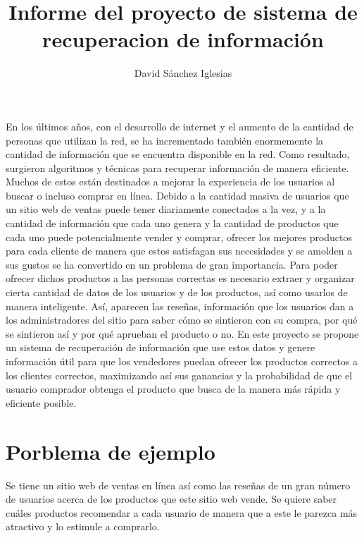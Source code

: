 \documentclass{llncs}
\title{Informe del proyecto de sistema de recuperacion de informaci\'on}
\author{David S\'anchez Iglesias}
\institute{Universidad de La Habana, Facultad de Matem\'atica y Computaci\'on}
\begin{document}
\maketitle

\begin{Introducción}
    En los \'ultimos a\~nos, con el desarrollo de internet y el aumento de la cantidad de personas que utilizan la red, se ha incrementado tambi\'en enormemente la cantidad de informaci\'on que se encuentra disponible en la red. Como resultado, surgieron algoritmos y t\'ecnicas para recuperar informaci\'on de manera eficiente. Muchos de estos est\'an destinados a mejorar la experiencia de los usuarios al buscar o incluso comprar en l\'inea. Debido a la cantidad masiva de usuarios que un sitio web de ventas puede tener diariamente conectados a la vez, y a la cantidad de informaci\'on que cada uno genera y la cantidad de productos que cada uno puede potencialmente vender y comprar, ofrecer los mejores productos para cada cliente de manera que estos satisfagan sus necesidades y se amolden a sus gustos se ha convertido en un problema de gran importancia. Para poder ofrecer dichos productos a las personas correctas es necesario extraer y organizar cierta cantidad de datos de los usuarios y de los productos, as\'i como usarlos de manera inteligente. As\'i, aparecen las rese\~nas, informaci\'on que los usuarios dan a los administradores del sitio para saber c\'omo se sintieron con su compra, por qu\'e se sintieron as\'i y por qu\'e aprueban el producto o no. En este proyecto se propone un sistema de recuperaci\'on de informaci\'on que use estos datos y genere informaci\'on \'util para que los vendedores puedan ofrecer los productos correctos a los clientes correctos, maximizando as\'i sus ganancias y la probabilidad de que el usuario comprador obtenga el producto que busca de la manera m\'as r\'apida y eficiente posible.
\end{Introducción}

\section{Porblema de ejemplo}
    Se tiene un sitio web de ventas en l\'inea as\'i como las rese\~nas de un gran n\'umero de usuarios acerca de los productos que este sitio web vende. Se quiere saber cu\'ales productos recomendar a cada usuario de manera que a este le parezca m\'as atractivo y lo estimule a comprarlo.

\end{document}
